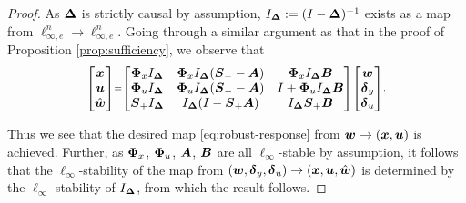 \begin{proof}
As $\D$ is strictly causal by assumption, $I_\D:= (I-\D)^{-1}$ exists as a map from $\ell^n_{\infty,e} \to \ell^n_{\infty,e}$.  Going through a similar argument as that in the proof of Proposition \ref{prop:sufficiency}, we observe that
\begin{equation}
\scriptstyle
\begin{bmatrix}
\x \\ \uu \\ \what
\end{bmatrix} =
\begin{bmatrix} \Phix I_\D & \Phix I_\D(\Sm - \A) & \Phix I_\D \B \\
\Phiu I_\D& \Phiu I_\D(\Sm-\A) & I + \Phiu I_\D\B \\
\Sp I_\D & I_\D(I - \Sp\A) & I_\D\Sp \B
\end{bmatrix} \begin{bmatrix} \tf w \\ \tf \delta_y \\ \tf \delta_u \end{bmatrix}.
\end{equation}

Thus we see that the desired map \eqref{eq:robust-response} from $\w \to (\x,\uu)$ is achieved.  Further, as $\Phix$, $\Phiu$, $\A$, $\B$ are all $\ell_\infty$-stable by assumption, it follows that the $\ell_\infty$-stability of the map from $(\tf w, \tf \delta_y, \tf \delta_u) \to (\x, \uu, \what)$ is determined by the $\ell_\infty$-stability of $I_\D$, from which the result follows.
\end{proof}
